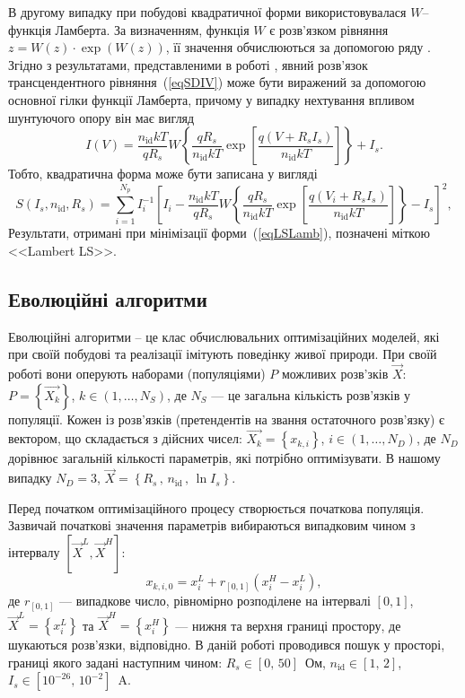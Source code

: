 В другому випадку при побудові квадратичної форми використовувалася $W$--функція Ламберта.
За визначенням, функція $W$ є розв'язком рівняння $z=W(z)\cdot\exp(W(z))$, її значення обчислюються за допомогою ряду \cite{LambertBook}.
Згідно з результатами, представленими в роботі \cite{Lambert_Jung}, явний розв'язок  трансцендентного рівняння~(\ref{eqSDIV}) може бути виражений за допомогою основної гілки функції Ламберта, причому у випадку нехтування впливом шунтуючого опору він має вигляд
\begin{equation}
\label{eqLam}
    I(V)=\frac{n_\mathrm{id}kT}{qR_s}W\left\{\frac{qR_s}{n_\mathrm{id}kT}
      \exp\left[\frac{q(V+R_sI_s)}{n_\mathrm{id}kT}\right]  \right\}+I_s.
\end{equation}
Тобто, квадратична форма може бути записана у вигляді
\begin{equation}
\label{eqLSLamb}
S(I_s,n_\mathrm{id},R_s)=\sum_{i=1}^{N_p}I_i^{-1}\left[I_i-\frac{n_\mathrm{id}kT}{qR_s}W\left\{\frac{qR_s}{n_\mathrm{id}kT}
      \exp\left[\frac{q(V_i+R_sI_s)}{n_\mathrm{id}kT}\right]  \right\}-I_s\right]^2,
\end{equation}
Результати, отримані при мінімізації форми~(\ref{eqLSLamb}), позначені міткою <<Lambert LS>>.


\subsection{Еволюційні алгоритми\label{subEA}}
Еволюційні алгоритми -- це клас обчислювальних оптимізаційних моделей, які при своїй побудові та реалізації імітують поведінку живої природи.
При своїй роботі вони оперують наборами (популяціями) $P$ можливих розв'зків
$\overrightarrow{X}$: $P=\left\{\overrightarrow{X_k}\right\}$, $k\in(1,\ldots, N_S)$,
де $N_S$ --- це загальна кількість розв'язків у популяції.
Кожен із розв'язків (претендентів на звання остаточного розв'язку) є вектором, що складається з дійсних чисел:
$\overrightarrow{X_k}=\left\{x_{k,i}\right\}$, $i\in(1,\ldots, N_D)$,
де
$N_D$ дорівнює загальній кількості параметрів, які потрібно оптимізувати.
В нашому випадку $N_D=3$, $\overrightarrow{X}=\left\{R_s\,,\,n_\mathrm{id}\,,\,\ln I_s\right\}$.

Перед початком оптимізаційного процесу створюється початкова популяція.
Зазвичай початкові значення параметрів вибираються випадковим чином з інтервалу
$[\overrightarrow{X}^{L}, \overrightarrow{X}^{H}]$:
\begin{equation}
\label{eqEAIn}
x_{k,i,0}=x_i^L+r_{[0,1]}(x_i^H-x_i^L),
\end{equation}
де
$r_{[0,1]}$ --- випадкове число, рівномірно розподілене на інтервалі $[0,1]$,
$\overrightarrow{X}^{L}=\left\{x_i^L\right\}$ та $\overrightarrow{X}^{H}=\left\{x_i^H\right\}$ ---
нижня та верхня границі простору, де шукаються розв'язки, відповідно.
В даній роботі проводився пошук у просторі, границі якого задані наступним чином:
$R_s\in[0,\,50]$~Ом, $n_\mathrm{id}\in[1,\,2]$, $I_s\in[10^{-26},\,10^{-2}]$~A.

